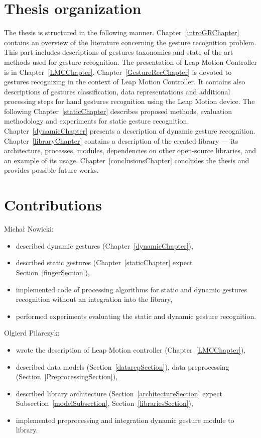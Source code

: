 \section{Thesis organization}
The thesis is structured in the following manner. 
Chapter~\ref{introGRChapter} contains an overview of the literature concerning the gesture recognition problem. 
This part includes descriptions of gestures taxonomies and state of the art methods used for gesture recognition.
The presentation of Leap Motion Controller is in Chapter~\ref{LMCChapter}.
Chapter~\ref{GestureRecChapter} is devoted to gestures recognizing in the context of Leap Motion Controller.
It contains also descriptions of gestures classification, data representations and additional processing steps for hand gestures recognition using the Leap Motion device. 
The following Chapter~\ref{staticChapter} describes proposed methods, evaluation methodology and experiments for static gesture recognition. 
Chapter~\ref{dynamicChapter} presents a description of dynamic gesture recognition. 
Chapter~\ref{libraryChapter} contains a description of the created library --- its architecture, processes, modules, dependencies on other open-source libraries, and an example of its usage. 
Chapter~\ref{conclusionsChapter} concludes the thesis and provides possible future works. 

\section{Contributions}
Michał Nowicki:
\begin {itemize} 
\item described dynamic gestures (Chapter~\ref{dynamicChapter}),
\item described static gestures (Chapter~\ref{staticChapter} expect Section~\ref{fingerSection}), 
\item implemented code of processing algorithms for static and dynamic gestures recognition without an integration into the library,
\item performed experiments evaluating the static and dynamic gesture recognition. 
\end {itemize}

Olgierd Pilarczyk:
\begin{itemize}
\item wrote the description of Leap Motion controller (Chapter~\ref{LMCChapter}),
\item described data models (Section~\ref{datarepSection}), data preprocessing (Section~\ref{PreprocessingSection}),
\item described library architecture (Section~\ref{architectureSection} expect Subsection~\ref{modelSubsection}, Section~\ref{librariesSection}),
\item implemented preprocessing and integration dynamic gesture module to library. 
\end {itemize}

